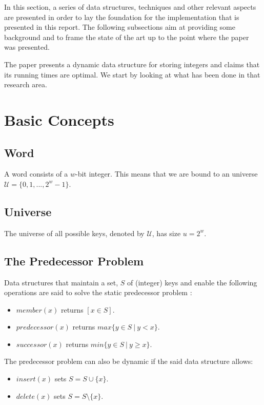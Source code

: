 In this section, a series of data structures, techniques and other relevant aspects are presented in order to lay the foundation for the implementation that is presented in this report. The following subsections aim at providing some background and to frame the state of the art up to the point where the  \cite{patrascu2014dynamic} paper was presented.

The \cite{patrascu2014dynamic} paper presents a dynamic data structure for storing integers and claims that its running times are optimal. We start by looking at what has been done in that research area.

\section{Basic Concepts}

\subsection{Word}
A word consists of a $w$-bit integer. This means that we are bound to an universe $\mathcal U = \{0, 1, ..., 2^{w}-1\}$.

\subsection{Universe}
The universe of all possible keys, denoted by $\mathcal U$, has size $u = 2^{w}$. 

\subsection{The Predecessor Problem}
Data structures that maintain a set, $S$ of (integer) keys and enable the following operations are said to solve the static predecessor problem \cite{beame1999optimal}:
\begin{itemize}
    \item
    $member(x)$ returns $[x \in S]$.
    \item
    $predecessor(x)$ returns $max\{y\in S\ |\ y < x\}$.
    \item
    $successor(x)$ returns $min\{y\in S\ |\ y \geq x\}$.
\end{itemize}

The predecessor problem can also be dynamic \cite{beame1999optimal} if the said data structure allows:
\begin{itemize}
    \item
    $insert(x)$ sets $S=S \cup \{x\}$.
    \item
    $delete(x)$ sets $S=S \setminus \{x\}$.
\end{itemize}

